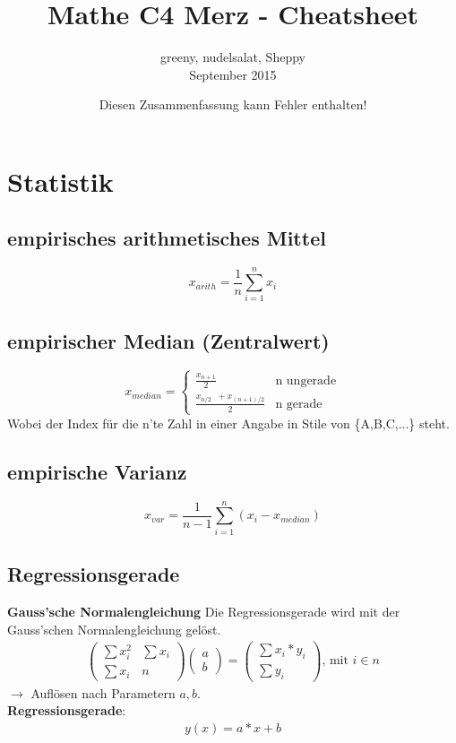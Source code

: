 \documentclass{article}
\title{Mathe C4 Merz - Cheatsheet}
\author{greeny, nudelsalat, Sheppy\\September 2015}
\date{Diesen Zusammenfassung kann Fehler enthalten!}
\begin{document}
\maketitle
\tableofcontents
\section{Statistik}
\subsection{empirisches arithmetisches Mittel}
\[x_{arith}=\frac{1}{n}\sum_{i=1}^n x_i\]
\subsection{empirischer Median (Zentralwert)}
\[
	x_{median}=
	\begin{cases}
		\frac{x_{n+1}}{2}								& \text{n ungerade} \\
		\frac{x_{n/2} \;\; + x_{(n+1)/2}}{2}	& \text{n gerade}
	\end{cases}
\]
Wobei der Index f\"ur die n'te Zahl in einer Angabe in Stile von \{A,B,C,...\} steht.
\subsection{empirische Varianz}
\[x_{var}=\frac{1}{n-1}\sum_{i=1}^n (x_i-x_{median})\]
\subsection{Regressionsgerade}
\textbf{Gauss'sche Normalengleichung}
Die Regressionsgerade wird mit der Gauss'schen Normalengleichung gel\"ost.
\begin{align}
	\begin{pmatrix}
		\sum x_i^2 & \sum x_i \\
		\sum x_i   & n
	\end{pmatrix}
	\begin{pmatrix}
		a \\
		b
	\end{pmatrix}
	=
	\begin{pmatrix}
		\sum x_i*y_i \\
		\sum y_i
	\end{pmatrix} \text{, mit $i \in n$}
\end{align}
$\rightarrow$ Auflösen nach Parametern $a,b$.\\
\textbf{Regressionsgerade}:
\begin{align}
	y(x) = a*x + b
\end{align}
\end{document}
